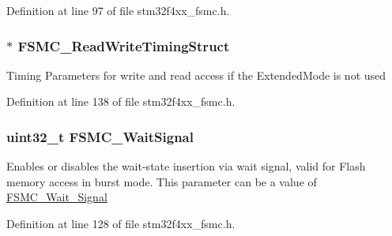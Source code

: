 Definition at line 97 of file stm32f4xx\-\_\-fsmc.\-h.

\hypertarget{struct_f_s_m_c___n_o_r_s_r_a_m_init_type_def_a9d18e112e4c644279e211c4a92dcd9a3}{
\subsubsection[{F\-S\-M\-C\-\_\-\-Read\-Write\-Timing\-Struct}]{$\ast$ F\-S\-M\-C\-\_\-\-Read\-Write\-Timing\-Struct}}\label{struct_f_s_m_c___n_o_r_s_r_a_m_init_type_def_a9d18e112e4c644279e211c4a92dcd9a3}
Timing Parameters for write and read access if the Extended\-Mode is not used 

Definition at line 138 of file stm32f4xx\-\_\-fsmc.\-h.

\hypertarget{struct_f_s_m_c___n_o_r_s_r_a_m_init_type_def_af7faa84a2f52410da02302eb2f48507a}{
\subsubsection[{F\-S\-M\-C\-\_\-\-Wait\-Signal}]{\setlength{\rightskip}{0pt plus 5cm}uint32\-\_\-t F\-S\-M\-C\-\_\-\-Wait\-Signal}}\label{struct_f_s_m_c___n_o_r_s_r_a_m_init_type_def_af7faa84a2f52410da02302eb2f48507a}
Enables or disables the wait-\/state insertion via wait signal, valid for Flash memory access in burst mode. This parameter can be a value of \hyperlink{group___f_s_m_c___wait___signal}{F\-S\-M\-C\-\_\-\-Wait\-\_\-\-Signal} 

Definition at line 128 of file stm32f4xx\-\_\-fsmc.\-h.

